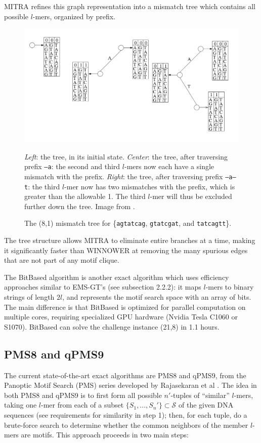\documentclass[oneside,12pt]{DISCSthesis}
\begin{document}
		\noindent MITRA refines this graph representation into a mismatch tree which contains all possible $l$-mers, organized by prefix.

		\begin{figure}[h] \label{fig:mitra}
			\includegraphics[width=6.0in]{img/mitra}
			\caption{The (8,1) mismatch tree for \{\texttt{agtatcag}, \texttt{gtatcgat}, and \texttt{tatcagtt}\}.\ }
			{\em Left}: the tree, in its initial state. {\em Center}: the tree, after traversing prefix \texttt{--a}: the second and third $l$-mers now each have a single mismatch with the prefix. {\em Right}: the tree, after traversing prefix \texttt{--a--t}: the third $l$-mer now has two mismatches with the prefix, which is greater than the allowable 1. The third $l$-mer will thus be excluded further down the tree. Image from \cite{eskin2002finding}.
			\end{figure}

		\noindent The tree structure allows MITRA to eliminate entire branches at a time, making it significantly faster than WINNOWER at removing the many spurious edges that are not part of any motif clique.

		The BitBased algorithm \cite{dasari2010efficient} is another exact algorithm which uses efficiency approaches similar to EMS-GT's (see subsection 2.2.2): it maps $l$-mers to binary strings of length $2l$, and represents the motif search space with an array of bits. The main difference is that BitBased is optimized for parallel computation on multiple cores, requiring specialized GPU hardware (Nvidia Tesla C1060 or S1070). BitBased can solve the challenge instance (21,8) in 1.1 hours.

	\subsection{PMS8 and qPMS9}
		The current state-of-the-art exact algorithms are PMS8 and qPMS9, from the Panoptic Motif Search (PMS) series
		 developed by Rajasekaran et al
		\cite{pms2007,pms2014,pms2015}. The idea in both PMS8 and qPMS9 is to first form all possible $n'$-tuples of ``similar'' $l$-mers, taking one $l$-mer from each of a subset $\{S_1,...,S_n'\} \subset \mathcal{S}$ of the given DNA sequences (see requirements for similarity in step 1); then, for each tuple, do a brute-force search to determine whether the common neighbors of the member $l$-mers are motifs. This approach proceeds in two main steps:
\end{document}
